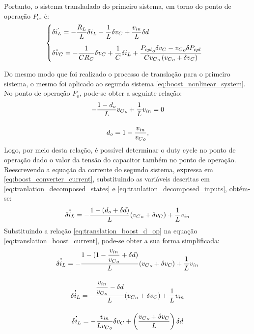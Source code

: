 Portanto, o sistema transladado do primeiro sistema, em torno do ponto de operação $P_o$, é: \begin{equation}
  \begin{cases}
    \displaystyle \delta \dot{i_L} = - \frac{R_L}{L} \delta i_L - \frac{1}{L} \delta v_C  + \frac{v_{in}}{L} \delta d \\[12pt]
    \displaystyle \delta \dt{v}_C = - \frac{1}{C R_C} \delta v_C  + \frac{1}{C}  \delta i_L + \frac{{P_{cpl}}_o \delta v_C - {v_C}_o \delta P_{cpl}}{C {v_C}_o \left({v_C}_o + \delta v_C\right)}
    \label{eq:translated_nonlinear_buck}
  \end{cases}
\end{equation}

Do mesmo modo que foi realizado o processo de translação para o primeiro sistema, o mesmo foi aplicado ao segundo sistema \eqref{eq:boost_nonlinear_system}. No ponto de operação $P_o$, pode-se obter a seguinte relação: \begin{gather}
  - \frac{1 - d_o}{L}{v_C}_o + \frac{1}{L}v_{in} = 0 \notag \\[12pt]
  {d}_o = 1 - \frac{v_{in}}{{v_C}_o} \label{eq:translation_boost_d_op},
\end{gather} Logo, por meio desta relação, é possível determinar o duty cycle no ponto de operação dado o valor da tensão do capacitor também no ponto de operação. Reescrevendo a equação da corrente do segundo sistema, expressa em \eqref{eq:boost_converter_current}, substituindo as variáveis descritas em \eqref{eq:tranlation_decomposed_states} e \eqref{eq:tranlation_decomposed_inputs}, obtém-se: \begin{gather}
  \dt{\delta i_L}  = - \frac{1 - (d_o + \delta d) }{L} ({v_C}_o + \delta v_C) + \frac{1}{L} v_{in} \label{eq:translation_boost_current}
\end{gather} Substituindo a relação \eqref{eq:translation_boost_d_op} na equação \eqref{eq:translation_boost_current}, pode-se obter a sua forma simplificada: \begin{gather}
  \dt{\delta i_L}  = - \frac{1 - (1 - \displaystyle \frac{v_{in}}{{v_C}_o} + \delta d) }{L} ({v_C}_o + \delta v_C) + \frac{1}{L} v_{in} \notag  \\[12pt]
  \dt{\delta i_L}  = - \frac{\displaystyle \frac{v_{in}}{{v_C}_o} - \delta d }{L} ({v_C}_o + \delta v_C) + \frac{1}{L} v_{in} \notag  \\[12pt]
  \dt{\delta i_L}  = - \frac{v_{in}}{L{v_C}_o}\delta v_C + \left(\frac{{v_C}_o + \delta {v_C}}{L}\right) \delta d
\end{gather}


